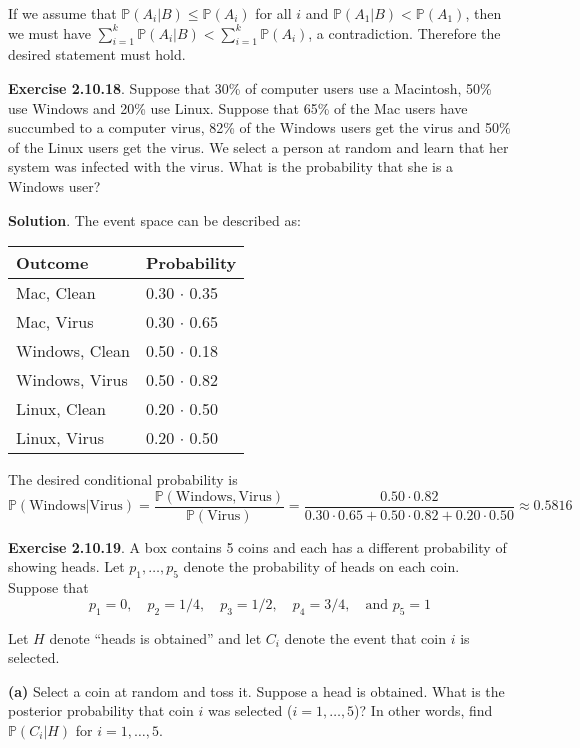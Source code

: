 If we assume that \(\mathbb{P}(A_{i} | B) \leq \mathbb{P}(A_{i})\) for all
\(i\) and \(\mathbb{P}(A_{1} | B) < \mathbb{P}(A_{1})\), then we must have
\(\sum_{i=1}^{k} \mathbb{P}(A_{i} | B) < \sum_{i=1}^{k} \mathbb{P}(A_{i})\), a
contradiction. Therefore the desired statement must hold.

\textbf{Exercise 2.10.18}. Suppose that 30\% of computer users use a
Macintosh, 50\% use Windows and 20\% use Linux. Suppose that 65\% of the
Mac users have succumbed to a computer virus, 82\% of the Windows users
get the virus and 50\% of the Linux users get the virus. We select a
person at random and learn that her system was infected with the virus.
What is the probability that she is a Windows user?

\textbf{Solution}. The event space can be described as:

\begin{table}[H]
\centering
\begin{tabular}{@{}ll@{}}
\toprule
Outcome & Probability \\
\midrule
Mac, Clean      & 0.30 $\cdot$ 0.35 \\
Mac, Virus      & 0.30 $\cdot$ 0.65 \\
Windows, Clean  & 0.50 $\cdot$ 0.18 \\
Windows, Virus  & 0.50 $\cdot$ 0.82 \\
Linux, Clean    & 0.20 $\cdot$ 0.50 \\
Linux, Virus    & 0.20 $\cdot$ 0.50 \\
\bottomrule
\end{tabular}
\end{table}

The desired conditional probability is
\[
\mathbb{P}(\text{Windows} | \text{Virus}) = \frac{\mathbb{P}(\text{Windows}, \text{Virus})}{\mathbb{P}(\text{Virus})}
= \frac{0.50 \cdot 0.82}{0.30 \cdot 0.65 + 0.50 \cdot 0.82 + 0.20 \cdot 0.50} \approx 0.5816
\]

\textbf{Exercise 2.10.19}. A box contains 5 coins and each has a
different probability of showing heads. Let \(p_{1}, \dots, p_{5}\) denote
the probability of heads on each coin. Suppose that
\[
p_{1} = 0, \quad p_{2} = 1/4, \quad p_{3} = 1/2, \quad p_{4} = 3/4, \quad \text{and } p_{5} = 1
\]

Let \(H\) denote ``heads is obtained'' and let \(C_{i}\) denote the event
that coin \(i\) is selected.

\textbf{(a)} Select a coin at random and toss it. Suppose a head is
obtained. What is the posterior probability that coin \(i\) was selected
(\(i = 1, \dots, 5\))? In other words, find \(\mathbb{P}(C_{i} | H)\) for
\(i = 1, \dots, 5\).

